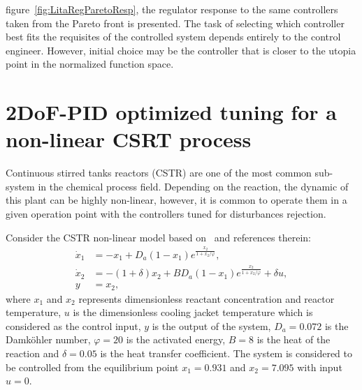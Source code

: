 %
figure~\ref{fig:LitaRegParetoResp}, the regulator response to the same controllers taken from the Pareto front is presented. The task of selecting which controller best fits the requisites of the controlled system depends entirely to the control engineer. However, initial choice may be the controller that is closer to the utopia point in the normalized function space.
\section{2DoF-PID optimized tuning for a non-linear CSRT process}
Continuous stirred tanks reactors (CSTR) are one of the most common sub-system in the chemical process field. Depending on the reaction, the dynamic of this plant can be highly non-linear, however, it is common to operate them in a given operation point with the controllers tuned for disturbances rejection.

Consider the CSTR non-linear model based on~\cite{Chang2013} and references therein:
\begin{align}
\dot{x}_1 &= -x_1+D_a(1-x_1)e^{\frac{x_2}{1+x_2/\varphi}},\label{CSTRModel01}\\
\dot{x}_2 &= -(1+\delta) x_2 + B D_a(1-x_1)e^{\frac{x_2}{1+x_2/\varphi}}+\delta u,\label{CSTRModel02}\\
y &= x_2,\label{CSTRModel03} 
\end{align}
%
where $x_1$ and $x_2$ represents dimensionless reactant concentration and reactor temperature, $u$ is the dimensionless cooling jacket temperature which is considered as the control input, $y$ is the output of the system, $D_a=0.072$ is the Damköhler number, $\varphi=20$ is the activated energy, $B=8$ is the heat of the reaction and $\delta=0.05$ is the heat transfer coefficient. The system is considered to be controlled from the equilibrium point $x_1=0.931$ and $x_2=7.095$ with input $u=0$.

